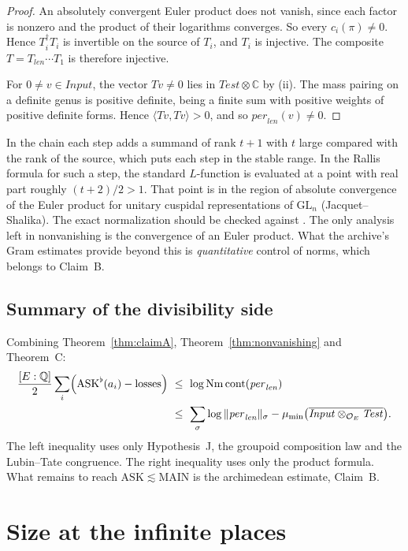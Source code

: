 \documentclass[11pt]{amsart}
\theoremstyle{definition}
\theoremstyle{remark}
\newcommand{\OEring}{\mathcal{O}_E}
\newcommand{\Input}{\mathit{Input}}
\newcommand{\Test}{\mathit{Test}}
\newcommand{\per}{\mathit{per}}
\newcommand{\len}{\mathit{len}}
\DeclareMathOperator{\Nm}{Nm}
\DeclareMathOperator{\cont}{cont}
\newcommand{\Q}{\mathbb{Q}}
\newcommand{\C}{\mathbb{C}}
\newcommand{\ASK}{\mathrm{ASK}}
\newcommand{\MAIN}{\mathrm{MAIN}}
\begin{document}
\begin{proof}
An absolutely convergent Euler product does not vanish, since each factor is nonzero and the product of their logarithms converges. So every $c_i(\pi)\ne0$. Hence $T_i^\dagger T_i$ is invertible on the source of $T_i$, and $T_i$ is injective. The composite $T=T_\len\cdots T_1$ is therefore injective.

For $0\ne v\in\Input$, the vector $Tv\ne0$ lies in $\Test\otimes\C$ by (ii). The mass pairing on a definite genus is positive definite, being a finite sum with positive weights of positive definite forms. Hence $\langle Tv,Tv\rangle>0$, and so $\per_\len(v)\ne0$.
\end{proof}

In the chain each step adds a summand of rank $t+1$ with $t$ large compared with the rank of the source, which puts each step in the stable range. In the Rallis formula for such a step, the standard $L$-function is evaluated at a point with real part roughly $(t+2)/2>1$. That point is in the region of absolute convergence of the Euler product for unitary cuspidal representations of $\mathrm{GL}_n$ (Jacquet--Shalika). The exact normalization should be checked against \cite{GQT}. The only analysis left in nonvanishing is the convergence of an Euler product. What the archive's Gram estimates provide beyond this is \emph{quantitative} control of norms, which belongs to Claim~B.

\subsection{Summary of the divisibility side}
Combining Theorem~\ref{thm:claimA}, Theorem~\ref{thm:nonvanishing} and Theorem~C:
\begin{align*}
\frac{[E:\Q]}2\sum_i\Bigl(\ASK^\flat(a_i)-\text{losses}\Bigr)\ &\le\ \log\Nm\cont(\per_\len)\\
&\le\ \sum_\sigma\log\|\per_\len\|_\sigma-\mu_{\min}\bigl(\overline{\Input\otimes_{\OEring}\Test}\bigr).
\end{align*}
The left inequality uses only Hypothesis~J, the groupoid composition law and the Lubin--Tate congruence. The right inequality uses only the product formula. What remains to reach $\ASK\lesssim\MAIN$ is the archimedean estimate, Claim~B.

\section{Size at the infinite places}\label{sec:size}
\end{document}
